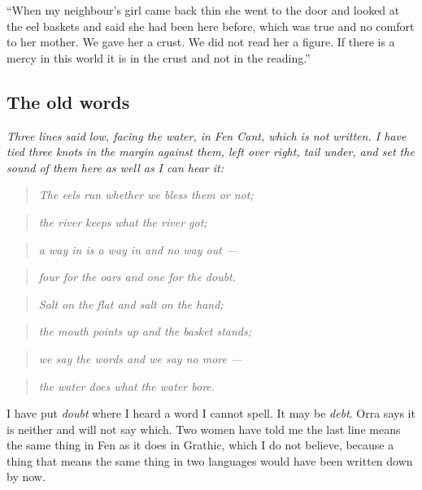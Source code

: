 \documentclass{design/chronicle}
\begin{document}
“When my neighbour’s girl came back thin she went to the door and looked at the eel baskets and said she had been here before, which was true and no comfort to her mother. We gave her a crust. We did not read her a figure. If there is a mercy in this world it is in the crust and not in the reading.”

\subsection*{The old words}

\emph{Three lines said low, facing the water, in Fen Cant, which is not written. I have tied three knots in the margin against them, left over right, tail under, and set the sound of them here as well as I can hear it:}

\begin{quote}\itshape The eels run whether we bless them or not;\end{quote}

\begin{quote}\itshape the river keeps what the river got;\end{quote}

\begin{quote}\itshape a way in is a way in and no way out —\end{quote}

\begin{quote}\itshape four for the oars and one for the doubt.\end{quote}

\begin{quote}\itshape \end{quote}

\begin{quote}\itshape Salt on the flat and salt on the hand;\end{quote}

\begin{quote}\itshape the mouth points up and the basket stands;\end{quote}

\begin{quote}\itshape we say the words and we say no more —\end{quote}

\begin{quote}\itshape the water does what the water bore.\end{quote}

I have put \emph{doubt} where I heard a word I cannot spell. It may be \emph{debt}. Orra says it is neither and will not say which. Two women have told me the last line means the same thing in Fen as it does in Grathic, which I do not believe, because a thing that means the same thing in two languages would have been written down by now.
\end{document}
